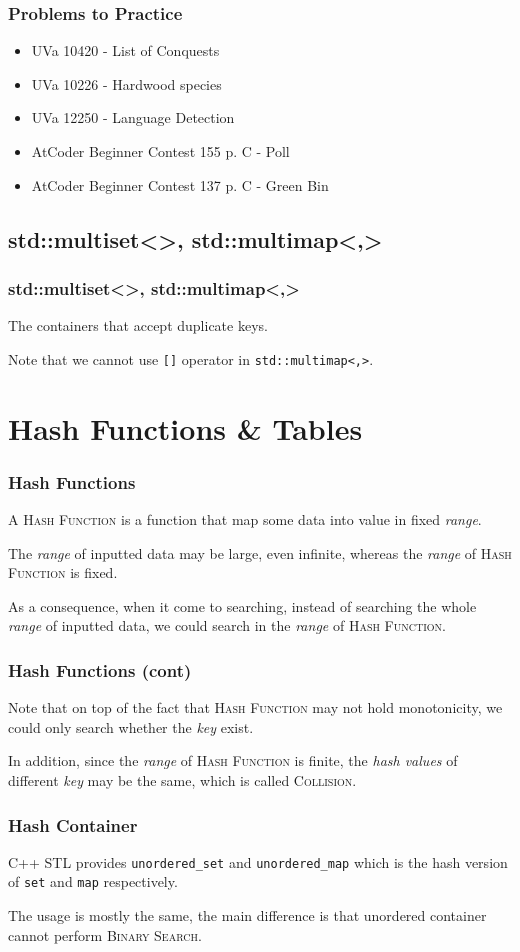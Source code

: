 \documentclass{beamer}
\begin{document}
\frame
{
	\frametitle{Problems to Practice}
	
	\begin{itemize}
		\item UVa 10420 - List of Conquests
		\item UVa 10226 - Hardwood species
		\item UVa 12250 - Language Detection
		\item AtCoder Beginner Contest 155 p. C - Poll
		\item AtCoder Beginner Contest 137 p. C - Green Bin
	\end{itemize}
}

\subsection{std::multiset<>, std::multimap<,>}

\frame
{
	\frametitle{\ttfamily std::multiset<>, std::multimap<,>}
	
	The containers that accept duplicate keys.
	
	Note that we cannot use \texttt{[]} operator in \texttt{std::multimap<,>}.
}

\section{Hash Functions \& Tables}

\frame
{
	\frametitle{Hash Functions}
	
	A \textsc{Hash Function} is a function that map some data into value in fixed \textit{range}.
	
	The \textit{range} of inputted data may be large, even infinite, whereas the \textit{range} of \textsc{Hash Function} is fixed.
	
	As a consequence, when it come to searching, instead of searching the whole \textit{range} of inputted data, we could search in the \textit{range} of \textsc{Hash Function}.
}

\frame
{
	\frametitle{Hash Functions (cont)}
	
	Note that on top of the fact that \textsc{Hash Function} may not hold monotonicity, we could only search whether the \textit{key} exist.
	
	In addition, since the \textit{range} of \textsc{Hash Function} is finite, the \textit{hash values} of different \textit{key} may be the same, which is called \textsc{Collision}.
}

\frame
{
	\frametitle{Hash Container}
	
	C++ STL provides \texttt{unordered\_set} and \texttt{unordered\_map} which is the hash version of \texttt{set} and \texttt{map} respectively.
	
	The usage is mostly the same, the main difference is that unordered container cannot perform \textsc{Binary Search}.
}
\end{document}
